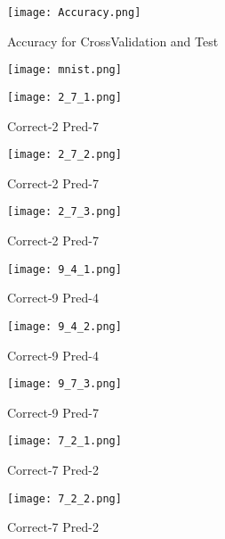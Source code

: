 \documentclass{article}
\begin{document}
\begin{figure}[h]
\vspace*{-2cm}
\centering
\texttt{[image: Accuracy.png]}
\caption{Accuracy for CrossValidation and Test}
\end{figure}
\begin{figure}[h]
\centering
\texttt{[image: mnist.png]}
\end{figure}

\begin{figure}[h]
\vspace*{-2cm}
\centering
\texttt{[image: 2\_7\_1.png]}
\caption{Correct-2 Pred-7}
\end{figure}
\begin{figure}[h]
\vspace*{-2cm}
\centering
\texttt{[image: 2\_7\_2.png]}
\caption{Correct-2 Pred-7}
\end{figure}
\begin{figure}[h]
\vspace*{-2cm}
\centering
\texttt{[image: 2\_7\_3.png]}
\caption{Correct-2 Pred-7}
\end{figure}
\begin{figure}[h]
\vspace*{-2cm}
\centering
\texttt{[image: 9\_4\_1.png]}
\caption{Correct-9 Pred-4}
\end{figure}
\begin{figure}[h]
\vspace*{-2cm}
\centering
\texttt{[image: 9\_4\_2.png]}
\caption{Correct-9 Pred-4}
\end{figure}
\begin{figure}[h]
\vspace*{-2cm}
\centering
\texttt{[image: 9\_7\_3.png]}
\caption{Correct-9 Pred-7}
\end{figure}
\begin{figure}[h]
\vspace*{-2cm}
\centering
\texttt{[image: 7\_2\_1.png]}
\caption{Correct-7 Pred-2}
\end{figure}

\begin{figure}[h]
\vspace*{-2cm}
\centering
\texttt{[image: 7\_2\_2.png]}
\caption{Correct-7 Pred-2}
\end{figure}
\end{document}
